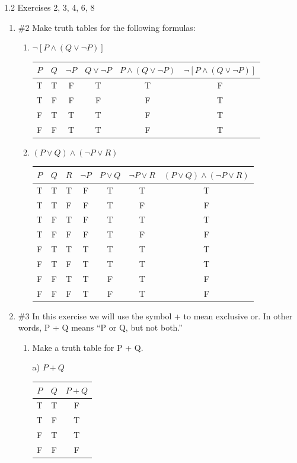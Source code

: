 \documentclass[12pt]{exam}
\begin{document}
\vspace{1cm}
1.2 Exercises 2, 3, 4, 6, 8
\begin {enumerate} [listparindent=1.5em]
\item $\#2$ Make truth tables for the following formulas:
\begin {enumerate} 
\item $\neg [P \land (Q \lor \neg P)]$

\begin{tabular}{c c|c|c|c|c}
$P$ & $Q$ & $\neg P$ & $Q \lor \neg P$ & $P \land (Q \lor \neg P)$ & $\neg [P \land (Q \lor \neg P)]$ \\
\hline
T & T & F & T & T & F \\
T & F & F & F & F & T \\
F & T & T & T & F & T \\
F & F & T & T & F & T
\end{tabular}

\vspace{1cm}

\item $(P \lor Q) \land (\neg P \lor R)$


\begin{tabular}{c c c|c|c|c|c}
$P$ & $Q$ & $R$ & $\neg P$ & $P \lor Q$ & $\neg P \lor R$ & $(P \lor Q) \land (\neg P \lor R)$ \\
\hline
T & T & T & F & T & T & T \\
T & T & F & F & T & F & F \\
T & F & T & F & T & T & T \\
T & F & F & F & T & F & F \\
F & T & T & T & T & T & T \\
F & T & F & T & T & T & T \\
F & F & T & T & F & T & F \\
F & F & F & T & F & T & F
\end{tabular}

\end{enumerate}

\item $\#3$ In this exercise we will use the symbol + to mean exclusive or. In
other words, P + Q means “P or Q, but not both.”
\begin {enumerate} 
\item Make a truth table for P + Q.

a) $P + Q$

\begin{tabular}{c c|c}
$P$ & $Q$ & $P + Q$ \\
\hline
T & T & F \\
T & F & T \\
F & T & T \\
F & F & F
\end{tabular}


\end{enumerate}
\end{enumerate}
\end{document}
